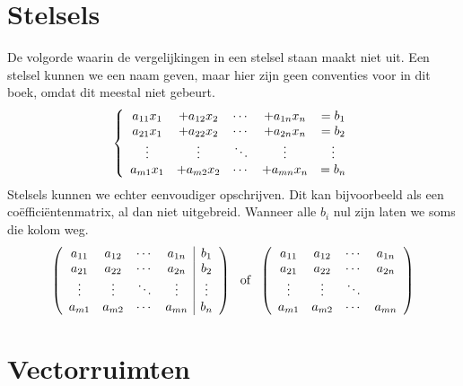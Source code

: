 \documentclass[lineaire_algebra_oplossingen.tex]{subfiles}
\begin{document}
\section{Stelsels}
De volgorde waarin de vergelijkingen in een stelsel staan maakt niet uit.
Een stelsel kunnen we een naam geven, maar hier zijn geen conventies voor in dit boek, omdat dit meestal niet gebeurt.
\[
\left\{
\begin{array}{c c c c c}
a_{11}x_{1} &+ a_{12}x_{2} & \cdots &+ a_{1n}x_{n} &= b_1\\
a_{21}x_{1} &+ a_{22}x_{2} & \cdots &+ a_{2n}x_{n} &= b_2\\
\vdots & \vdots & \ddots & \vdots & \vdots \\
a_{m1}x_{1} &+ a_{m2}x_{2} & \cdots &+ a_{mn}x_{n} &= b_n\\
\end{array}
\right.
\]
Stelsels kunnen we echter eenvoudiger opschrijven. Dit kan bijvoorbeeld als een co\"effici\"entenmatrix, al dan niet uitgebreid. Wanneer alle $b_i$ nul zijn laten we soms die kolom weg.
\[
\left(
\begin{array}{c c c c | c}
a_{11} & a_{12} & \cdots & a_{1n} & b_1\\
a_{21} & a_{22} & \cdots & a_{2n} & b_2\\
\vdots & \vdots & \ddots & \vdots & \vdots \\
a_{m1} & a_{m2} & \cdots & a_{mn} & b_n\\
\end{array}
\right)
\ 
\text{ of }
\ 
\left(
\begin{array}{c c c c}
a_{11} & a_{12} & \cdots & a_{1n}\\
a_{21} & a_{22} & \cdots & a_{2n}\\
\vdots & \vdots & \ddots &   \\
a_{m1} & a_{m2} & \cdots & a_{mn}\\
\end{array}
\right)
\]


\section{Vectorruimten}
\end{document}
